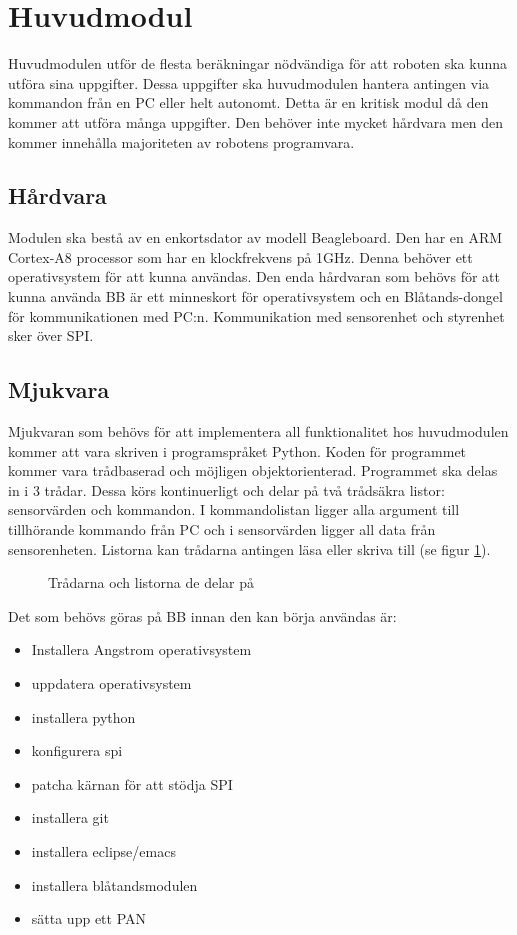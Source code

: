 \setcounter{secnumdepth}{5}
\section{Huvudmodul}
Huvudmodulen utför de flesta beräkningar nödvändiga för att roboten ska kunna utföra sina uppgifter. Dessa uppgifter ska huvudmodulen hantera antingen via kommandon från en PC eller helt autonomt. Detta är en kritisk modul då den kommer att utföra många uppgifter. Den behöver inte mycket hårdvara men den kommer innehålla majoriteten av robotens programvara.

\subsection{Hårdvara}
Modulen ska bestå av en enkortsdator av modell Beagleboard. Den har en ARM Cortex-A8 processor som har en klockfrekvens på 1GHz. Denna behöver ett operativsystem för att kunna användas. Den enda hårdvaran som behövs för att kunna använda BB är ett minneskort för operativsystem och en Blåtands-dongel för kommunikationen med PC:n. Kommunikation med sensorenhet och styrenhet sker över SPI.

\subsection{Mjukvara}
Mjukvaran som behövs för att implementera all funktionalitet hos huvudmodulen kommer att vara skriven i programspråket Python. Koden för programmet kommer vara trådbaserad och möjligen objektorienterad. 
\newline
Programmet ska delas in i 3 trådar. Dessa körs kontinuerligt och delar på två trådsäkra listor: sensorvärden och kommandon. I kommandolistan ligger alla argument till tillhörande kommando från PC och i sensorvärden ligger all data från sensorenheten. Listorna kan trådarna antingen läsa eller skriva till (se figur \ref{designspec:huvudmodul-tradar}).

\begin{figure}[h]
\scalebox{0.8}{}
\caption{Trådarna och listorna de delar på} \label{designspec:huvudmodul-tradar}
\end{figure}

Det som behövs göras på BB innan den kan börja användas är:
\begin{itemize}
\item Installera Angstrom operativsystem
\item uppdatera operativsystem
\item installera python
\item konfigurera spi
\item patcha kärnan för att stödja SPI
\item installera git
\item installera eclipse/emacs
\item installera blåtandsmodulen
\item sätta upp ett PAN
\end{itemize}

